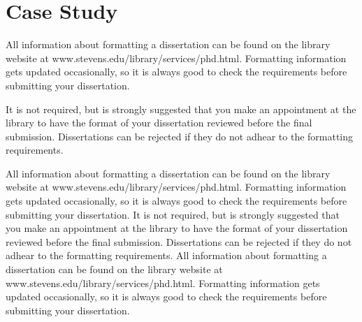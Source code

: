 \documentclass[12pt]{report}
\begin{document}



\chapter{Case Study}
All information about formatting a dissertation can be found on the library website at www.stevens.edu/library/services/phd.html.  Formatting information gets updated occasionally, so it is always good to check the requirements before submitting your dissertation.  

It is not required, but is strongly suggested that you make an appointment at the library to have the format of your dissertation reviewed before the final submission.  Dissertations can be rejected if they do not adhear to the formatting requirements.   

All information about formatting a dissertation can be found on the library website at www.stevens.edu/library/services/phd.html.  Formatting information gets updated occasionally, so it is always good to check the requirements before submitting your dissertation.  
It is not required, but is strongly suggested that you make an appointment at the library to have the format of your dissertation reviewed before the final submission.  Dissertations can be rejected if they do not adhear to the formatting requirements.   
All information about formatting a dissertation can be found on the library website at www.stevens.edu/library/services/phd.html.  Formatting information gets updated occasionally, so it is always good to check the requirements before submitting your dissertation.  
\end{document}

